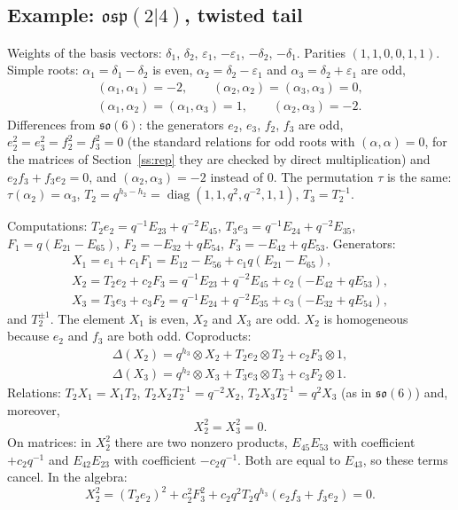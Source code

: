 \documentclass[12pt,a4paper]{article}
\newcommand{\so}{\mathfrak{so}}
\newcommand{\osp}{\mathfrak{osp}}
\newcommand{\ot}{\otimes}
\newcommand{\diag}{\operatorname{diag}}
\begin{document}
\subsection{Example: $\osp(2|4)$, twisted tail}
Weights of the basis vectors: $\delta_1$, $\delta_2$, $\varepsilon_1$, $-\varepsilon_1$, $-\delta_2$, $-\delta_1$. Parities
$(1,1,0,0,1,1)$. Simple roots: $\alpha_1=\delta_1-\delta_2$ is even, $\alpha_2=\delta_2-\varepsilon_1$ and $\alpha_3=\delta_2+\varepsilon_1$ are odd,
\begin{gather*}
(\alpha_1,\alpha_1)=-2,\qquad(\alpha_2,\alpha_2)=(\alpha_3,\alpha_3)=0,\\
(\alpha_1,\alpha_2)=(\alpha_1,\alpha_3)=1,\qquad(\alpha_2,\alpha_3)=-2 .
\end{gather*}
Differences from $\so(6)$: the generators $e_2$, $e_3$, $f_2$, $f_3$ are odd, $e_2^2=e_3^2=f_2^2=f_3^2=0$ (the standard
relations for odd roots with $(\alpha,\alpha)=0$, for the matrices of Section~\ref{ss:rep} they are checked by direct multiplication) and $e_2f_3+f_3e_2=0$, and $(\alpha_2,\alpha_3)=-2$ instead of $0$. The permutation $\tau$ is the same: $\tau(\alpha_2)=\alpha_3$,
$T_2=q^{h_3-h_2}=\diag(1,1,q^2,q^{-2},1,1)$, $T_3=T_2^{-1}$.

Computations: $T_2e_2=q^{-1}E_{23}+q^{-2}E_{45}$, $T_3e_3=q^{-1}E_{24}+q^{-2}E_{35}$,
$F_1=q(E_{21}-E_{65})$, $F_2=-E_{32}+qE_{54}$, $F_3=-E_{42}+qE_{53}$. Generators:
\begin{gather*}
X_1=e_1+c_1F_1=E_{12}-E_{56}+c_1q(E_{21}-E_{65}),\\
X_2=T_2e_2+c_2F_3=q^{-1}E_{23}+q^{-2}E_{45}+c_2(-E_{42}+qE_{53}),\\
X_3=T_3e_3+c_3F_2=q^{-1}E_{24}+q^{-2}E_{35}+c_3(-E_{32}+qE_{54}),
\end{gather*}
and $T_2^{\pm1}$. The element $X_1$ is even, $X_2$ and $X_3$ are odd. $X_2$ is homogeneous because $e_2$ and $f_3$ are both odd.
Coproducts:
\begin{gather*}
\Delta(X_2)=q^{h_3}\ot X_2+T_2e_2\ot T_2+c_2F_3\ot1,\\
\Delta(X_3)=q^{h_2}\ot X_3+T_3e_3\ot T_3+c_3F_2\ot1 .
\end{gather*}
Relations: $T_2X_1=X_1T_2$, $T_2X_2T_2^{-1}=q^{-2}X_2$, $T_2X_3T_2^{-1}=q^{2}X_3$ (as in $\so(6)$) and, moreover,
\[
X_2^2=X_3^2=0 .
\]
On matrices: in $X_2^2$ there are two nonzero products, $E_{45}E_{53}$ with coefficient $+c_2q^{-1}$ and $E_{42}E_{23}$ with
coefficient $-c_2q^{-1}$. Both are equal to $E_{43}$, so these terms cancel. In the algebra:
\[
X_2^2=(T_2e_2)^2+c_2^2F_3^2+c_2q^2T_2q^{h_3}(e_2f_3+f_3e_2)=0 .
\]
\end{document}
